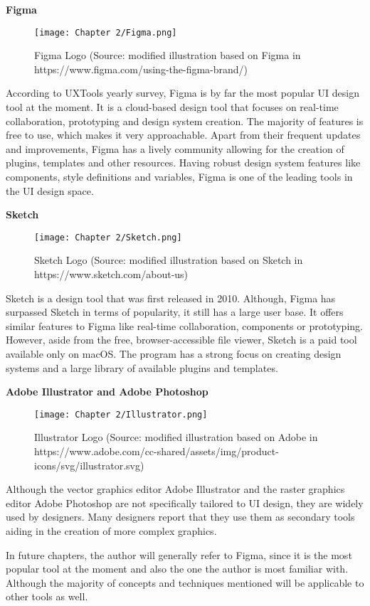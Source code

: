 \textbf{Figma}\\
\begin{figure}[H]
    \texttt{[image: Chapter 2/Figma.png]}
    \caption{Figma Logo (Source: modified illustration based on Figma in https://www.figma.com/using-the-figma-brand/)}
\end{figure}
According to UXTools yearly survey, Figma is by far the most popular UI design tool at the moment.
 It is a cloud-based design tool that focuses on real-time
collaboration, prototyping and design system creation. The majority of features is free to use,
which makes it very approachable. Apart from their frequent updates and improvements, Figma has a
lively community allowing for the creation of plugins, templates and other resources. Having robust
design system features like components, style definitions and variables, Figma is one of the leading
tools in the UI design space. 

\textbf{Sketch}\\
\begin{figure}[H]
    \texttt{[image: Chapter 2/Sketch.png]}
    \caption{Sketch Logo (Source: modified illustration based on Sketch in https://www.sketch.com/about-us)}
\end{figure}
Sketch is a design tool that was first released in 2010. Although, Figma has surpassed Sketch in
terms of popularity, it still has a large user base. It offers similar features to Figma like
real-time collaboration, components or prototyping. However, aside from the free, browser-accessible
file viewer, Sketch is a paid tool available only on macOS. The program has a strong focus on
creating design systems and a large library of available plugins and templates. 

\textbf{Adobe Illustrator and Adobe Photoshop}\\
\begin{figure}[H]
    \texttt{[image: Chapter 2/Illustrator.png]}
    \caption{Illustrator Logo (Source: modified illustration based on Adobe in https://www.adobe.com/cc-shared/assets/img/product-icons/svg/illustrator.svg)}
\end{figure}
Although the vector graphics editor Adobe Illustrator and the raster graphics editor Adobe Photoshop
are not specifically tailored to UI design, they are widely used by designers. Many designers report
that they use them as secondary tools aiding in the creation of more complex graphics.

In future chapters, the author will generally refer to Figma, since it is the most popular tool at
the moment and also the one the author is most familiar with. Although the majority of concepts and
techniques mentioned will be applicable to other tools as well.
